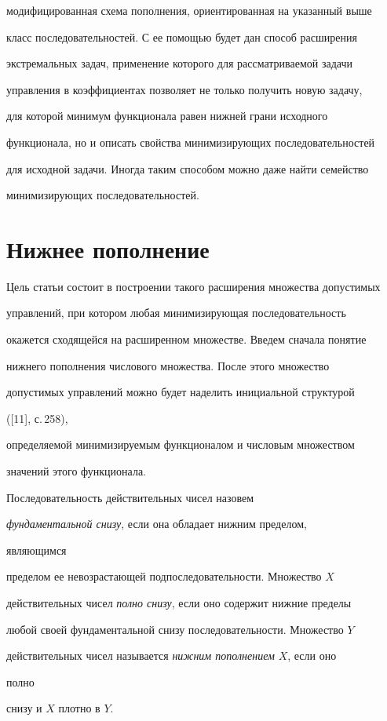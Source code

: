 модифицированная схема пополнения, ориентированная на указанный выше 


класс последовательностей. С ее помощью будет дан способ расширения 


экстремальных задач, применение которого для рассматриваемой задачи 


управления в коэффициентах позволяет не только получить новую задачу, 


для которой минимум функционала равен нижней грани исходного 


функционала, но и описать свойства минимизирующих последовательностей 


для исходной задачи. Иногда таким способом можно даже найти семейство 


минимизирующих последовательностей. 


 


 


\section{Нижнее пополнение} 


 


Цель статьи состоит в построении такого расширения множества допустимых 


управлений, при котором любая минимизирующая последовательность 


окажется сходящейся на расширенном множестве. Введем сначала понятие 


нижнего пополнения числового множества. После этого множество 


допустимых управлений можно будет наделить инициальной структурой 


([11], с.\,258), 


определяемой минимизируемым функционалом и числовым множеством 


значений этого функционала. 


 


\begin{defn} 


Последовательность действительных чисел назовем 


{\it фундаментальной снизу}, если она обладает нижним пределом, 


являющимся 


пределом ее невозрастающей подпоследовательности. Множество $X$ 


действительных чисел {\it полно снизу}, если оно содержит нижние пределы 


любой своей фундаментальной снизу последовательности. Множество $Y$ 


действительных чисел называется {\it нижним пополнением} $X$, если оно 


полно 


снизу и $X$ плотно в $Y$. 


\end{defn} 


